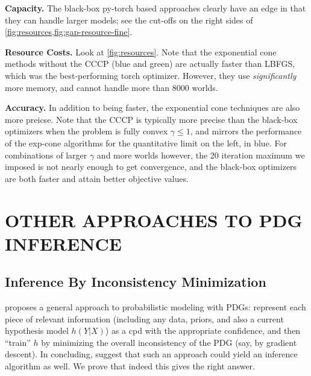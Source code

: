 \documentclass[twoside]{article}
\begin{document}
\textbf{Capacity.}
The black-box py-torch based approaches clearly have an edge in that they can handle larger models; see the cut-offs on the right sides of \cref{fig:resources,fig:gap-resource-fine}.

\textbf{Resource Costs.}
Look at \cref{fig:resources}.
Note that the exponential cone methods without the CCCP (blue and green) are actually faster than LBFGS, which was the best-performing torch optimizer.
However, they use \emph{significantly} more memory, and cannot handle more than 8000 worlds.


\textbf{Accuracy.}
In addition to being faster, the exponential cone techniques are also more preicse.
Note that the CCCP is typically more precise than the black-box optimizers when the problem is fully convex $\gamma \le 1$, and mirrors the performance of the exp-cone algorithms for the quantitative limit on the left, in blue.  For combinations of larger $\gamma$ and more worlds however, the 20 iteration maximum we imposed is not nearly enough to get convergence, and the black-box optimizers are both faster and attain better objective values.
\section{OTHER APPROACHES TO PDG INFERENCE} \label{sec:other-inference}

\subsection{Inference By Inconsistency Minimization}
\textcite{one-true-loss} proposes a general 
approach to probabilistic modeling with PDGs: represent each piece of relevant information (including any data, priors, and also a current hypothesis model $h(Y|X)$) as a cpd with the appropriate confidence, and then ``train'' $h$ by minimizing the overall inconsistency of the PDG (say, by gradient descent).
In concluding,
\textcite{pdg-aaai} suggest that such an approach
could yield an inference algorithm as well.
We prove that indeed this gives the right answer.
\end{document}
